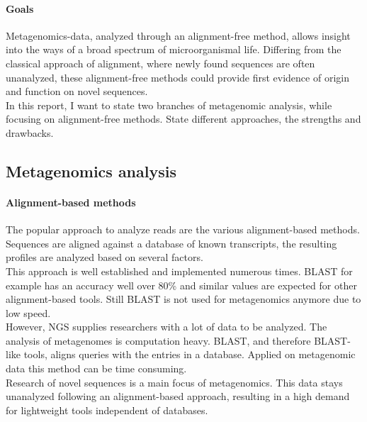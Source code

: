\documentclass[twocolumn]{bmcart}%
\begin{document}
\paragraph*{Goals}
Metagenomics-data, analyzed through an alignment-free method, allows insight into the ways of a broad spectrum of  microorganismal life. Differing from the classical approach of alignment, where newly found sequences are often unanalyzed, these alignment-free methods could provide first evidence of origin and function on novel sequences.\\
In this report, I want to state two branches of metagenomic analysis, while focusing on alignment-free methods. State different approaches, the strengths and drawbacks.
\subsection*{Metagenomics analysis}
\paragraph*{Alignment-based methods}
The popular approach to analyze reads are the various alignment-based methods.\\
Sequences are aligned against a database of known transcripts, the resulting profiles are analyzed based on several factors.\\
This approach is well established and implemented numerous times. BLAST for example has an accuracy well over 80\%\cite{doi:10.1142/9789814295291_0003}  and similar values are expected for other alignment-based tools. Still BLAST is not used for metagenomics anymore due to low speed.\\
However, NGS supplies researchers with a lot of data to be analyzed. The analysis of metagenomes is computation heavy. BLAST, and therefore BLAST-like tools, aligns queries with the entries in a database. Applied on metagenomic data this method can be time consuming.\\
Research of  novel sequences is a main focus of metagenomics. This data stays unanalyzed following an alignment-based approach, resulting in a high demand for lightweight tools independent of databases.
\end{document}
